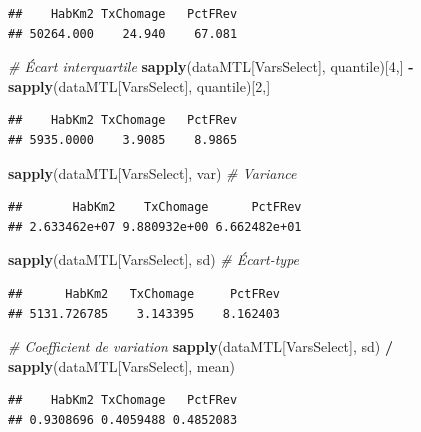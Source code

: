 \documentclass[
  11pt,
  french,
]{book}
\makeatletter
\newenvironment{Shaded}{\begin{snugshade}}{\end{snugshade}}
\newcommand{\CommentTok}[1]{\textcolor[rgb]{0.56,0.35,0.01}{\textit{#1}}}
\newcommand{\DecValTok}[1]{\textcolor[rgb]{0.00,0.00,0.81}{#1}}
\newcommand{\KeywordTok}[1]{\textcolor[rgb]{0.13,0.29,0.53}{\textbf{#1}}}
\newcommand{\NormalTok}[1]{#1}
\newcommand{\OperatorTok}[1]{\textcolor[rgb]{0.81,0.36,0.00}{\textbf{#1}}}
\newcommand{\StringTok}[1]{\textcolor[rgb]{0.31,0.60,0.02}{#1}}
\newenvironment{kframe}{%
\medskip{}
\setlength{\fboxsep}{.8em}
 \def\at@end@of@kframe{}%
 \ifinner\ifhmode%
  \def\at@end@of@kframe{\end{minipage}}%
  \begin{minipage}{\columnwidth}%
 \fi\fi%
 \def\FrameCommand##1{\hskip\@totalleftmargin \hskip-\fboxsep
 \colorbox{shadecolor}{##1}\hskip-\fboxsep
     \hskip-\linewidth \hskip-\@totalleftmargin \hskip\columnwidth}%
 \MakeFramed {\advance\hsize-\width
   \@totalleftmargin\z@ \linewidth\hsize
   \@setminipage}}%
 {\par\unskip\endMakeFramed%
 \at@end@of@kframe}
\renewenvironment{Shaded}{\begin{kframe}}{\end{kframe}}
\makeatother
\begin{document}
\begin{verbatim}
##    HabKm2 TxChomage   PctFRev 
## 50264.000    24.940    67.081
\end{verbatim}

\begin{Shaded}
\begin{Highlighting}[]
\CommentTok{# Écart interquartile}
\KeywordTok{sapply}\NormalTok{(dataMTL[VarsSelect], quantile)[}\DecValTok{4}\NormalTok{,] }\OperatorTok{-}\StringTok{ }\KeywordTok{sapply}\NormalTok{(dataMTL[VarsSelect], quantile)[}\DecValTok{2}\NormalTok{,]}
\end{Highlighting}
\end{Shaded}

\begin{verbatim}
##    HabKm2 TxChomage   PctFRev 
## 5935.0000    3.9085    8.9865
\end{verbatim}

\begin{Shaded}
\begin{Highlighting}[]
\KeywordTok{sapply}\NormalTok{(dataMTL[VarsSelect], var)    }\CommentTok{# Variance}
\end{Highlighting}
\end{Shaded}

\begin{verbatim}
##       HabKm2    TxChomage      PctFRev 
## 2.633462e+07 9.880932e+00 6.662482e+01
\end{verbatim}

\begin{Shaded}
\begin{Highlighting}[]
\KeywordTok{sapply}\NormalTok{(dataMTL[VarsSelect], sd)     }\CommentTok{# Écart-type}
\end{Highlighting}
\end{Shaded}

\begin{verbatim}
##      HabKm2   TxChomage     PctFRev 
## 5131.726785    3.143395    8.162403
\end{verbatim}

\begin{Shaded}
\begin{Highlighting}[]
\CommentTok{# Coefficient de variation}
\KeywordTok{sapply}\NormalTok{(dataMTL[VarsSelect], sd) }\OperatorTok{/}\StringTok{ }\KeywordTok{sapply}\NormalTok{(dataMTL[VarsSelect], mean)}
\end{Highlighting}
\end{Shaded}

\begin{verbatim}
##    HabKm2 TxChomage   PctFRev 
## 0.9308696 0.4059488 0.4852083
\end{verbatim}
\end{document}
